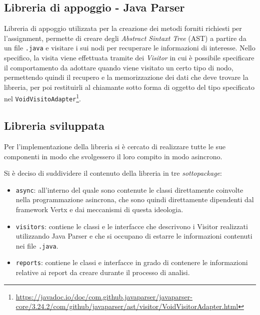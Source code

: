 \subsection{Libreria di appoggio - Java Parser}
\label{subs:javaparser}

Libreria di appoggio utilizzata per la creazione dei metodi forniti richiesti per l'assignment, permette di creare degli \textit{Abstract Sintaxt Tree} (AST) a partire da un file \texttt{.java} e visitare i sui nodi per recuperare le informazioni di interesse.
%
Nello specifico, la visita viene effettuata tramite dei \textit{Visitor} in cui è possibile specificare il comportamento da adottare quando viene visitato un certo tipo di nodo, permettendo quindi il recupero e la memorizzazione dei dati che deve trovare la libreria, per poi restituirli al chiamante sotto forma di oggetto del tipo specificato nel \texttt{VoidVisitoAdapter}\footnote{\url{https://javadoc.io/doc/com.github.javaparser/javaparser-core/3.24.2/com/github/javaparser/ast/visitor/VoidVisitorAdapter.html}}.

\subsection{Libreria sviluppata}
\label{subs:library_developed}

Per l'implementazione della libreria si è cercato di realizzare tutte le sue componenti in modo che svolgessero il loro compito in modo asincrono.

Si è deciso di suddividere il contenuto della libreria in tre \textit{sottopackage}:

\begin{itemize}
    \item \texttt{async}: all'interno del quale sono contenute le classi direttamente coinvolte nella programmazione asincrona, che sono quindi direttamente dipendenti dal framework Vertx e dai meccanismi di questa ideologia.

    \item \texttt{visitors}: contiene le classi e le interfacce che descrivono i Visitor realizzati utilizzando Java Parser e che si occupano di estarre le informazioni contenuti nei file \texttt{.java}.

    \item \texttt{reports}: contiene le classi e interfacce in grado di contenere le informazioni relative ai report da creare durante il processo di analisi.
\end{itemize}

